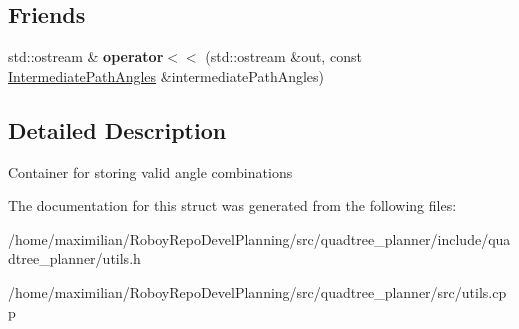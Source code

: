 \subsection*{Friends}
\begin{DoxyCompactItemize}
\item 
\mbox{\label{structquadtree__planner_1_1IntermediatePathAngles_aebdbac34a0623bf6750fdaf798c9122b}} 
std\+::ostream \& {\bfseries operator$<$$<$} (std\+::ostream \&out, const \hyperlink{structquadtree__planner_1_1IntermediatePathAngles}{Intermediate\+Path\+Angles} \&intermediate\+Path\+Angles)
\end{DoxyCompactItemize}


\subsection{Detailed Description}
Container for storing valid angle combinations 

The documentation for this struct was generated from the following files\+:\begin{DoxyCompactItemize}
\item 
/home/maximilian/\+Roboy\+Repo\+Devel\+Planning/src/quadtree\+\_\+planner/include/quadtree\+\_\+planner/utils.\+h\item 
/home/maximilian/\+Roboy\+Repo\+Devel\+Planning/src/quadtree\+\_\+planner/src/utils.\+cpp\end{DoxyCompactItemize}
